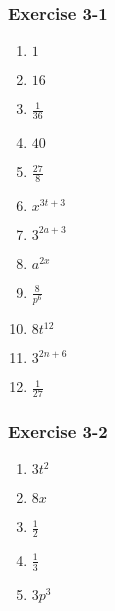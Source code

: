 {\begin{multicols}{3}
  \subsubsection*{Exercise 3-1} %
  \begin{enumerate}[label=\textbf{\arabic*}.,itemsep=1pt]
  \item $1$%
  \item $16$%
  \item $\frac{1}{36}$%
  \item $40$%
  \item $\frac{27}{8}$%
  \item $x^{3t+3}$%
  \item $3^{2a+3}$%
  \item $a^{2x}$%
  \item $\frac{8}{p^6}$%
  \item $8t^{12}$%
  \item $3^{2n+6}$%
  \item $\frac{1}{27}$%
  \end{enumerate}

  \subsubsection*{Exercise 3-2} %
  \begin{enumerate}[label=\textbf{\arabic*}.,itemsep=1pt]
  \item $3t^2$%
  \item $8x$%
  \item $\frac{1}{2}$%
  \item $\frac{1}{3}$%
  \item $3p^3$%
  \end{enumerate}


\end{multicols}}
